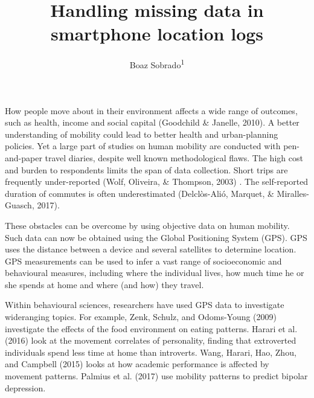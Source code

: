\documentclass[english,man]{apa6}
\title{Handling missing data in smartphone location logs}
\author{Boaz Sobrado\textsuperscript{1}}
\affiliation{
    \vspace{0.5cm}
          \textsuperscript{1} Utrecht University  }
\theoremstyle{definition}
\theoremstyle{definition}
\theoremstyle{definition}
\theoremstyle{remark}
\begin{document}
\maketitle

\setcounter{secnumdepth}{0}



How people move about in their environment affects a wide range of
outcomes, such as health, income and social capital (Goodchild \&
Janelle, 2010). A better understanding of mobility could lead to better
health and urban-planning policies. Yet a large part of studies on human
mobility are conducted with pen-and-paper travel diaries, despite well
known methodological flaws. The high cost and burden to respondents
limits the span of data collection. Short trips are frequently
under-reported (Wolf, Oliveira, \& Thompson, 2003) . The self-reported
duration of commutes is often underestimated (Delclòs-Alió, Marquet, \&
Miralles-Guasch, 2017).

These obstacles can be overcome by using objective data on human
mobility. Such data can now be obtained using the Global Positioning
System (GPS). GPS uses the distance between a device and several
satellites to determine location. GPS measurements can be used to infer
a vast range of socioeconomic and behavioural measures, including where
the individual lives, how much time he or she spends at home and where
(and how) they travel.

Within behavioural sciences, researchers have used GPS data to
investigate wideranging topics. For example, Zenk, Schulz, and
Odoms-Young (2009) investigate the effects of the food environment on
eating patterns. Harari et al. (2016) look at the movement
correlates of personality, finding that extroverted individuals spend less
time at home than introverts. Wang, Harari, Hao, Zhou, and Campbell
(2015) looks at how academic performance is affected by movement
patterns. Palmius et al. (2017) use mobility patterns to predict bipolar
depression.
\end{document}
